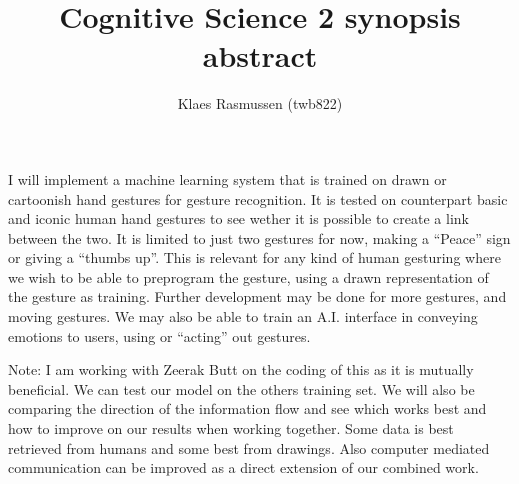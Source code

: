 \documentclass[11pt,a4paper]{article}
\begin{document}
\title{Cognitive Science 2 synopsis abstract}
\author{Klaes Rasmussen (twb822)}
\date{}
\maketitle

I will implement a machine learning system that is trained on drawn or cartoonish hand gestures for gesture recognition. It is tested on counterpart basic and iconic human hand gestures to see wether it is possible to create a link between the two. It is limited to just two gestures for now, making a ``Peace'' sign or giving a ``thumbs up''. This is relevant for any kind of human gesturing where we wish to be able to preprogram the gesture, using a drawn representation of the gesture as training. Further development may be done for more gestures, and moving gestures. We may also be able to train an A.I. interface in conveying emotions to users, using or ``acting'' out gestures.

\vspace{1.5pc}

Note: I am working with Zeerak Butt on the coding of this as it is mutually beneficial. We can test our model on the others training set. We will also be comparing the direction of the information flow and see which works best and how to improve on our results when working together. Some data is best retrieved from humans and some best from drawings. Also computer mediated communication can be improved as a direct extension of our combined work.
\end{document}
